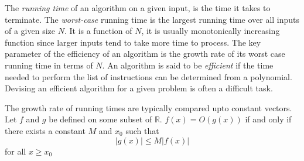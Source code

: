 \documentclass[10pt]{CSUNthesis}
\theoremstyle{plain}%
\theoremstyle{definition}
\theoremstyle{remark}
\newcommand{\bbR}{{\mathbb{R}}}
\begin{document}
The \textit{running time} of an algorithm on a given input, is the time it takes to terminate.%
The \textit{worst-case} running time is the largest running time over all inputs of a given size $N$.  
It is a function of $N$, it is usually monotonically increasing function since larger inputs tend to take more time to process.
The key parameter of the efficiency of an algorithm is the growth rate of its worst case running time in terms of $N$.
An algorithm is said to be \textit{efficient} if the time needed to perform the list of instructions can be determined from a polynomial. 
Devising an efficient algorithm for a given problem is often a difficult task.%

The growth rate of running times are typically compared upto constant vectors.
Let $f$ and $g$ be defined on some subset of $\bbR$.  
$f(x) = O\left(g(x)\right)$ if and only if there exists a constant $M$ and $x_0$ such that $$\left\vert g(x)\right\vert \leq M \left\vert f(x) \right\vert$$
for all $x \geq x_0$




\end{document}
